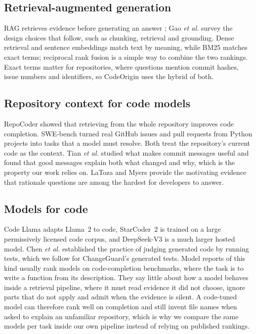 \documentclass[12pt,onecolumn,draftclsnofoot]{IEEEtran}
\begin{document}
\subsection{Retrieval-augmented generation}
RAG retrieves evidence before generating an answer \cite{lewis2020rag}; Gao \emph{et al.} \cite{gao2023ragsurvey} survey the design choices that follow, such as chunking, retrieval and grounding. Dense retrieval \cite{karpukhin2020dpr} and sentence embeddings \cite{reimers2019sbert} match text by meaning, while BM25 \cite{robertson2009bm25} matches exact terms; reciprocal rank fusion \cite{cormack2009rrf} is a simple way to combine the two rankings. Exact terms matter for repositories, where questions mention commit hashes, issue numbers and identifiers, so CodeOrigin uses the hybrid of both.

\subsection{Repository context for code models}
RepoCoder \cite{zhang2023repocoder} showed that retrieving from the whole repository improves code completion. SWE-bench \cite{jimenez2024swebench} turned real GitHub issues and pull requests from Python projects into tasks that a model must resolve. Both treat the repository's current code as the context. Tian \emph{et al.} \cite{tian2022commit} studied what makes commit messages useful and found that good messages explain both what changed and why, which is the property our work relies on. LaToza and Myers \cite{latoza2010hard} provide the motivating evidence that rationale questions are among the hardest for developers to answer.

\subsection{Models for code}
Code Llama \cite{roziere2023codellama} adapts Llama~2 \cite{touvron2023llama2} to code, StarCoder~2 \cite{lozhkov2024starcoder2} is trained on a large permissively licensed code corpus, and DeepSeek-V3 \cite{deepseek2024v3} is a much larger hosted model. Chen \emph{et al.} \cite{chen2021codex} established the practice of judging generated code by running tests, which we follow for ChangeGuard's generated tests. Model reports of this kind usually rank models on code-completion benchmarks, where the task is to write a function from its description. They say little about how a model behaves inside a retrieval pipeline, where it must read evidence it did not choose, ignore parts that do not apply and admit when the evidence is silent. A code-tuned model can therefore rank well on completion and still invent file names when asked to explain an unfamiliar repository, which is why we compare the same models per task inside our own pipeline instead of relying on published rankings.
\end{document}
